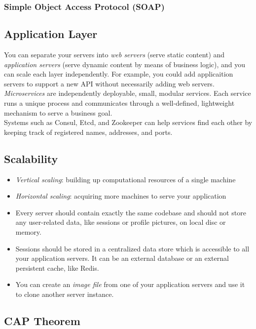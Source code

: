\documentclass[12pt, titlepage]{article}
\begin{document}
\subsubsection{Simple Object Access Protocol (SOAP)}

\subsection{Application Layer}

You can separate your servers into \textit{web servers} (serve static content) and \textit{application servers} (serve dynamic content by means of business logic), and you can scale each layer independently. For example, you could add applicaition servers to support a new API without necessarily adding web servers. \\

\textit{Microservices} are independently deployable, small, modular services. Each service runs a unique process and communicates through a well-defined, lightweight mechanism to serve a business goal. \\

Systems such as Consul, Etcd, and Zookeeper can help services find each other by keeping track of registered names, addresses, and ports.

\subsection{Scalability}

\begin{itemize}
  \item \textit{Vertical scaling}: building up computational resources of a single machine
  \item \textit{Horizontal scaling}: acquiring more machines to serve your application
  \item Every server should contain exactly the same codebase and should not store any user-related data, like sessions or profile pictures, on local disc or memory.
  \item Sessions should be stored in a centralized data store which is accessible to all your application servers. It can be an external database or an external persistent cache, like Redis.
  \item You can create an \textit{image file} from one of your application servers and use it to clone another server instance.
\end{itemize}

\subsection{CAP Theorem}
\end{document}
